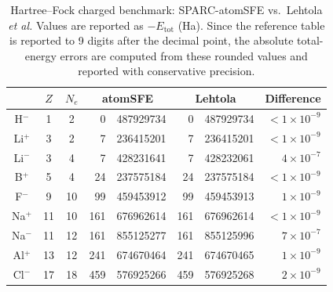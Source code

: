 \begin{table}[htbp]
    \centering
    \footnotesize
    \setlength{\tabcolsep}{4pt}
    \caption{Hartree--Fock charged benchmark: SPARC-atomSFE vs.\ Lehtola \textit{et al.}
    Values are reported as $-E_{\mathrm{tot}}$ (Ha). Since the reference table is reported to 9 digits after the decimal point, the absolute total-energy errors are computed from these rounded values and reported with conservative precision.}
    \label{tab:ae-hf-charged-unpolarized}
    \begin{tabular}{@{}c c c r@{.}l r@{.}l r@{}}
        \toprule
         & $Z$ & $N_e$ & \multicolumn{2}{c}{atomSFE} & \multicolumn{2}{c}{Lehtola} & \multicolumn{1}{c}{Difference} \\
        \midrule
        H$^{-}$  &  1 &  2 & 0   & 487929734 & 0   & 487929734 & $<1\times10^{-9}$ \\
        Li$^{+}$ &  3 &  2 & 7   & 236415201 & 7   & 236415201 & $<1\times10^{-9}$ \\
        Li$^{-}$ &  3 &  4 & 7   & 428231641 & 7   & 428232061 & $\phantom{<}4\times10^{-7}$ \\
        B$^{+}$  &  5 &  4 & 24  & 237575184 & 24  & 237575184 & $<1\times10^{-9}$ \\
        F$^{-}$  &  9 & 10 & 99  & 459453912 & 99  & 459453913 & $\phantom{<}1\times10^{-9}$ \\
        Na$^{+}$ & 11 & 10 & 161 & 676962614 & 161 & 676962614 & $<1\times10^{-9}$ \\
        Na$^{-}$ & 11 & 12 & 161 & 855125277 & 161 & 855125996 & $\phantom{<}7\times10^{-7}$ \\
        Al$^{+}$ & 13 & 12 & 241 & 674670464 & 241 & 674670465 & $\phantom{<}1\times10^{-9}$ \\
        Cl$^{-}$ & 17 & 18 & 459 & 576925266 & 459 & 576925268 & $\phantom{<}2\times10^{-9}$ \\
        \bottomrule
    \end{tabular}
\end{table}


